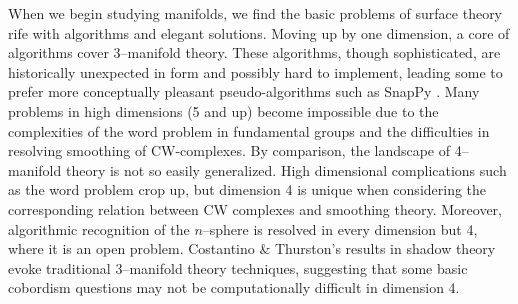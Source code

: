 \label{chapter:introduction}

When we begin studying manifolds, we find the basic problems of surface theory rife with algorithms and elegant solutions.
Moving up by one dimension, a core of algorithms cover 3--manifold theory.
These algorithms, though sophisticated, are historically unexpected in form and possibly hard to implement, leading some to prefer more conceptually pleasant pseudo-algorithms such as SnapPy \cite{culler2017snappy}.
Many problems in high dimensions (5 and up) become impossible due to the complexities of the word problem in fundamental groups and the difficulties in resolving smoothing of CW-complexes.
By comparison, the landscape of 4--manifold theory is not so easily generalized.
High dimensional complications such as the word problem crop up, but dimension 4 is unique when considering the corresponding relation between CW complexes and smoothing theory.
Moreover, algorithmic recognition of the $n$--sphere is resolved in every dimension but 4, where it is an open problem.
Costantino \& Thurston's results in shadow theory evoke traditional 3--manifold theory techniques, suggesting that some basic cobordism questions may not be computationally difficult in dimension 4.



